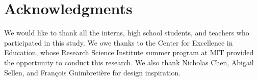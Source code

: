\documentclass{sigchi}
\begin{document}












\section{Acknowledgments}
We would like to thank all the interns, high school students, and teachers who participated in this study.
We owe thanks to the Center for Excellence in Education, whose Research Science Institute summer program at MIT provided the opportunity to conduct this research. We also thank Nicholas Chen, Abigail Sellen, and Fran\c{c}ois Guimbreti\`{e}re for design inspiration.

%
%
%
%
%
\balance{}



\end{document}
